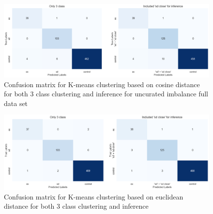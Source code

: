 \begin{figure}[H]
    \centering
    \includegraphics[scale=0.37]{figures/cconfusion.png} 
    \caption{Confusion matrix for K-means clustering based on cosine distance for both 3 class clustering and inference for uncurated imbalance full data set}
    \label{fig:cconfusion}
\end{figure}

\begin{table}[H]
    \centering
    \caption{Inference evaluation results on euclidean distance based on K-means}
    \label{tab:professional_table}
\end{table}


\begin{figure}[H]
    \centering
    \includegraphics[scale=0.37]{figures/econfuse.png} 
    \caption{Confusion matrix for K-means clustering based on euclidean distance for both 3 class clustering and inference}
    \label{fig:econfuse.png}
\end{figure}

